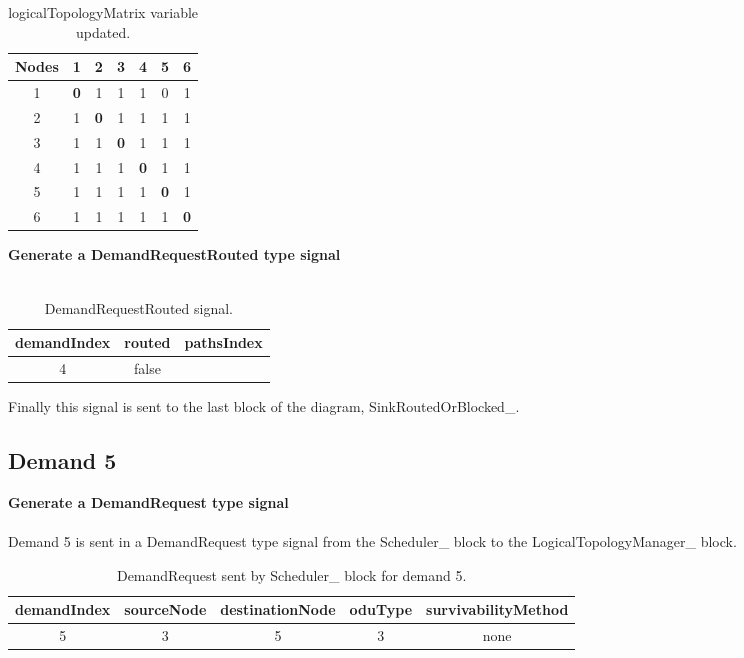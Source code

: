 \begin{table}[H]
	\centering	
	\begin{tabular}{|c|c|c|c|c|c|c|}
		\hline
		\multicolumn{1}{|l|}{\textbf{Nodes}} & 1   & 2   & 3   & 4   & 5   & 6  \\ \hline
		1                           & \textbf{0}   & 1 & 1 & 1 & 0 & 1 \\ \hline
		2                           & 1 & \textbf{0}   & 1 & 1 & 1 & 1 \\ \hline
		3                           & 1 & 1 & \textbf{0}   & 1 & 1 & 1 \\ \hline
		4                           & 1 & 1 & 1 & \textbf{0}   & 1 & 1 \\ \hline
		5                           & 1 & 1 & 1 & 1 & \textbf{0}   & 1 \\ \hline
		6                           & 1 & 1 & 1 & 1 & 1 & \textbf{0}   \\ \hline
	\end{tabular}
	\caption{logicalTopologyMatrix variable updated.}
	\label{Transparentlogical_topology_updated}
\end{table}

\textbf{Generate a DemandRequestRouted type signal}\\ \\

\begin{table}[H]
	\centering
	\begin{tabular}{|c|c|c|}
		\hline
		demandIndex & routed & pathsIndex \\ \hline
		4 & false &  \\ \hline
	\end{tabular}
	\caption{DemandRequestRouted signal.}
\end{table}

Finally this signal is sent to the last block of the diagram, SinkRoutedOrBlocked\_.

\subsection{Demand 5}
\textbf{Generate a DemandRequest type signal}\\ \\
Demand 5 is sent in a DemandRequest type signal from the Scheduler\_  block to the LogicalTopologyManager\_  block.
\begin{table}[H]
	\centering
	\begin{tabular}{|c|c|c|c|c|}
		\hline
		demandIndex & sourceNode & destinationNode & oduType & survivabilityMethod \\ \hline
		5           & 3          & 5               & 3       & none                   \\ \hline
	\end{tabular}
	\caption{DemandRequest sent by Scheduler\_  block for demand 5.}
\end{table}

